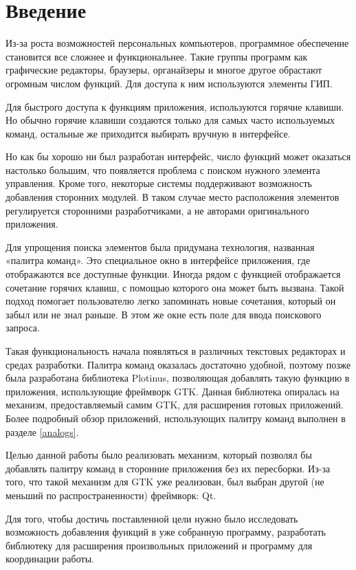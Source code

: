 \chapter*{Введение}

Из-за роста возможностей персональных компьютеров, программное обеспечение
становится все сложнее и функциональнее. Такие группы программ как графические
редакторы, браузеры, органайзеры и многое другое обрастают
огромным числом функций. Для доступа к ним используются элементы ГИП.

Для быстрого доступа к функциям приложения, используются горячие клавиши. Но
обычно горячие клавиши создаются только для самых часто используемых команд,
остальные же приходится выбирать вручную в интерфейсе.

Но как бы хорошо ни был разработан интерфейс, число функций может оказаться
настолько большим, что появляется проблема с поиском нужного элемента
управления. Кроме того, некоторые системы поддерживают возможность добавления
сторонних модулей. В таком случае место расположения элементов регулируется
сторонними разработчиками, а не авторами оригинального приложения.

Для упрощения поиска элементов была придумана технология, названная «палитра
команд». Это специальное окно в интерфейсе приложения, где отображаются все
доступные функции.
Иногда рядом с функцией отображается сочетание горячих клавиш, с помощью
которого она может быть вызвана. Такой подход помогает пользователю легко
запоминать новые сочетания, который он забыл или не знал раньше.
В этом же окне есть поле для ввода поискового запроса.

Такая функциональность начала появляться в различных текстовых редакторах и
средах разработки. Палитра команд оказалась достаточно удобной, поэтому позже
была разработана библиотека Plotinus, позволяющая добавлять такую функцию в
приложения, использующие фреймворк GTK. Данная библиотека опиралась на механизм,
предоставляемый самим GTK, для расширения готовых приложений. Более подробный
обзор приложений, использующих палитру команд выполнен в разделе \ref{analogs}.

Целью данной работы было реализовать механизм, который позволял бы добавлять
палитру команд в сторонние приложения без их пересборки. Из-за того, что такой
механизм для GTK уже реализован, был выбран другой (не меньший по
распространенности) фреймворк: Qt.

Для того, чтобы достичь поставленной цели нужно было исследовать возможность
добавления функций в уже собранную программу, разработать библиотеку для
расширения произвольных приложений и программу для координации работы.

